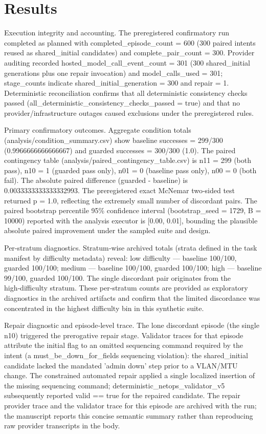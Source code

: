 \documentclass[conference]{IEEEtran}
\begin{document}
\section{Results}
Execution integrity and accounting. The preregistered confirmatory run completed as planned with completed\_episode\_count = 600 (300 paired intents reused as shared\_initial candidates) and complete\_pair\_count = 300. Provider auditing recorded hosted\_model\_call\_event\_count = 301 (300 shared\_initial generations plus one repair invocation) and model\_calls\_used = 301; stage\_counts indicate shared\_initial\_generation = 300 and repair = 1. Deterministic reconciliation confirms that all deterministic consistency checks passed (all\_deterministic\_consistency\_checks\_passed = true) and that no provider/infrastructure outages caused exclusions under the preregistered rules.

Primary confirmatory outcomes. Aggregate condition totals (analysis/condition\_summary.csv) show baseline successes = 299/300 (0.9966666666666667) and guarded successes = 300/300 (1.0). The paired contingency table (analysis/paired\_contingency\_table.csv) is n11 = 299 (both pass), n10 = 1 (guarded pass only), n01 = 0 (baseline pass only), n00 = 0 (both fail). The absolute paired difference (guarded - baseline) is 0.0033333333333332993. The preregistered exact McNemar two‑sided test returned p = 1.0, reflecting the extremely small number of discordant pairs. The paired bootstrap percentile 95\% confidence interval (bootstrap\_seed = 1729, B = 10000) reported with the analysis executor is [0.00, 0.01], bounding the plausible absolute paired improvement under the sampled suite and design.

Per‑stratum diagnostics. Stratum‑wise archived totals (strata defined in the task manifest by difficulty metadata) reveal: low difficulty --- baseline 100/100, guarded 100/100; medium --- baseline 100/100, guarded 100/100; high --- baseline 99/100, guarded 100/100. The single discordant pair originates from the high‑difficulty stratum. These per‑stratum counts are provided as exploratory diagnostics in the archived artifacts and confirm that the limited discordance was concentrated in the highest difficulty bin in this synthetic suite.

Repair diagnostic and episode‑level trace. The lone discordant episode (the single n10) triggered the prerogative repair stage. Validator traces for that episode attribute the initial flag to an omitted sequencing command required by the intent (a must\_be\_down\_for\_fields sequencing violation): the shared\_initial candidate lacked the mandated 'admin down' step prior to a VLAN/MTU change. The constrained automated repair applied a single localized insertion of the missing sequencing command; deterministic\_netops\_validator\_v5 subsequently reported valid == true for the repaired candidate. The repair provider trace and the validator trace for this episode are archived with the run; the manuscript reports this concise semantic summary rather than reproducing raw provider transcripts in the body.
\end{document}
